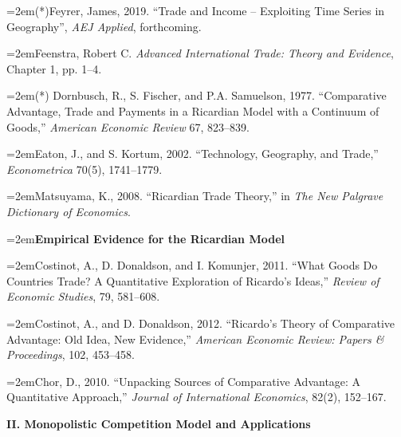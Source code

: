 \documentclass[10pt]{article}
\newcommand{\reading}{\par\hangindent=2em\hangafter=1\noindent}
\newenvironment{readingsblock}{%
  \begin{adjustwidth}{2em}{0pt} %
}{%
  \end{adjustwidth}
}
\begin{document}
\begin{readingsblock}

  \reading (*)Feyrer, James, 2019. “Trade and Income – Exploiting Time Series in Geography”, \textit{AEJ Applied}, forthcoming.
  
  \reading Feenstra, Robert C. \textit{Advanced International Trade: Theory and Evidence}, Chapter 1, pp. 1–4.

  \reading (*) Dornbusch, R., S. Fischer, and P.A. Samuelson, 1977. “Comparative Advantage, Trade and Payments in a Ricardian Model with a Continuum of Goods,” \textit{American Economic Review} 67, 823–839.

  \reading Eaton, J., and S. Kortum, 2002. “Technology, Geography, and Trade,” \textit{Econometrica} 70(5), 1741–1779.

  \reading Matsuyama, K., 2008. “Ricardian Trade Theory,” in \textit{The New Palgrave Dictionary of Economics}.\\[4pt]

  \reading \textbf{Empirical Evidence for the Ricardian Model} \\

\reading Costinot, A., D. Donaldson, and I. Komunjer, 2011. ``What Goods Do Countries Trade? A Quantitative Exploration of Ricardo's Ideas,'' \textit{Review of Economic Studies}, 79, 581–608.

\reading Costinot, A., and D. Donaldson, 2012. ``Ricardo’s Theory of Comparative Advantage: Old Idea, New Evidence,'' \textit{American Economic Review: Papers \& Proceedings}, 102, 453–458.

\reading Chor, D., 2010. ``Unpacking Sources of Comparative Advantage: A Quantitative Approach,'' \textit{Journal of International Economics}, 82(2), 152–167.\\[4pt]
\end{readingsblock}


\noindent \textbf{II. Monopolistic Competition Model and Applications} \\[6pt]
\end{document}
